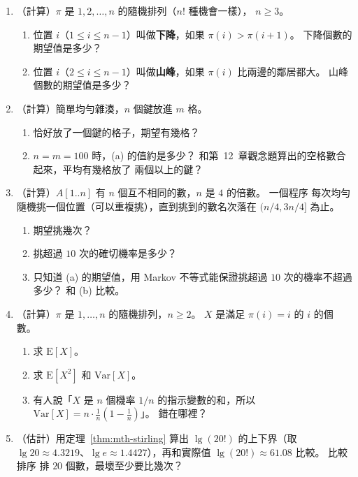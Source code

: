 \begin{enumerate}
\item \label{mth-q-perm}（計算）$\pi$ 是 $1, 2, \ldots, n$ 的隨機排列（$n!$ 種機會一樣），
$n \ge 3$。
\begin{enumerate}[nosep]
\item 位置 $i$（$1 \le i \le n - 1$）叫做\textbf{下降}，如果 $\pi(i) > \pi(i+1)$。 下降個數的
期望值是多少？
\item 位置 $i$（$2 \le i \le n - 1$）叫做\textbf{山峰}，如果 $\pi(i)$ 比兩邊的鄰居都大。 山峰
個數的期望值是多少？
\end{enumerate}

\item \label{mth-q-single}（計算）簡單均勻雜湊，$n$ 個鍵放進 $m$ 格。
\begin{enumerate}[nosep]
\item 恰好放了一個鍵的格子，期望有幾格？
\item $n = m = 100$ 時，(a) 的值約是多少？ 和第~12~章觀念題算出的空格數合起來，平均有幾格放了
兩個以上的鍵？
\end{enumerate}

\item \label{mth-q-retry}（計算）$A[1..n]$ 有 $n$ 個互不相同的數，$n$ 是 $4$ 的倍數。 一個程序
每次均勻隨機挑一個位置（可以重複挑），直到挑到的數名次落在 $(n/4, 3n/4]$ 為止。
\begin{enumerate}[nosep]
\item 期望挑幾次？
\item 挑超過 $10$ 次的確切機率是多少？
\item 只知道 (a) 的期望值，用 Markov 不等式能保證挑超過 $10$ 次的機率不超過多少？
和 (b) 比較。
\end{enumerate}

\item \label{mth-q-fixed}（計算）$\pi$ 是 $1, \ldots, n$ 的隨機排列，$n \ge 2$。 $X$ 是滿足
$\pi(i) = i$ 的 $i$ 的個數。
\begin{enumerate}[nosep]
\item 求 $\mathrm{E}[X]$。
\item 求 $\mathrm{E}[X^2]$ 和 $\mathrm{Var}[X]$。
\item 有人說「$X$ 是 $n$ 個機率 $1/n$ 的指示變數的和，所以 $\mathrm{Var}[X] = n \cdot \frac1n
(1 - \frac1n)$」。 錯在哪裡？
\end{enumerate}

\item \label{mth-q-stir}（估計）用定理~\ref{thm:mth-stirling} 算出 $\lg(20!)$ 的上下界（取
$\lg 20 \approx 4.3219$、$\lg e \approx 1.4427$），再和實際值 $\lg(20!) \approx 61.08$ 比較。 比較排序
排 $20$ 個數，最壞至少要比幾次？
\end{enumerate}

